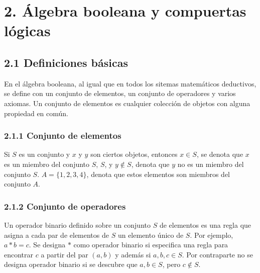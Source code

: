 
\newpage
\section*{2. \'{A}lgebra booleana y compuertas l\'{o}gicas}
\paragraph*{} \normalsize

\subsection*{2.1 Definiciones b\'{a}sicas} En el \'{a}lgebra booleana, al igual
que en todos los sitemas matem\'{a}ticos deductivos, se define con un conjunto
de elementos, un conjunto de operadores y varios axiomas. Un conjunto de
elementos es cualquier colecci\'{o}n de objetos con alguna propiedad en
com\'{u}n.

\subsubsection*{2.1.1 Conjunto de elementos} Si $S$ es un conjunto y $x$ y $y$
son ciertos objetos, entonces $x \in S$, se denota que $x$ es un miembro del
conjunto $S$, $S$, y $y \notin S$, denota que $y$ no es un miembro del conjunto
$S$. $A = \{1, 2, 3, 4\}$, denota que estos elementos son miembros del conjunto
$A$.

\subsubsection*{2.1.2 Conjunto de operadores} Un operador binario definido
sobre un conjunto $S$ de elementos es una regla que asigna a cada par de
elementos de $S$ un elemento \'{u}nico de $S$. Por ejemplo, $a * b = c$. Se
designa $*$ como operador binario si especifica una regla para encontrar $c$ a
partir del par $(a, b)$ y adem\'{a}s si $a, b, c \in S$. Por contraparte no se
designa operador binario si se descubre que $a, b \in S$, pero $c \notin S$.

